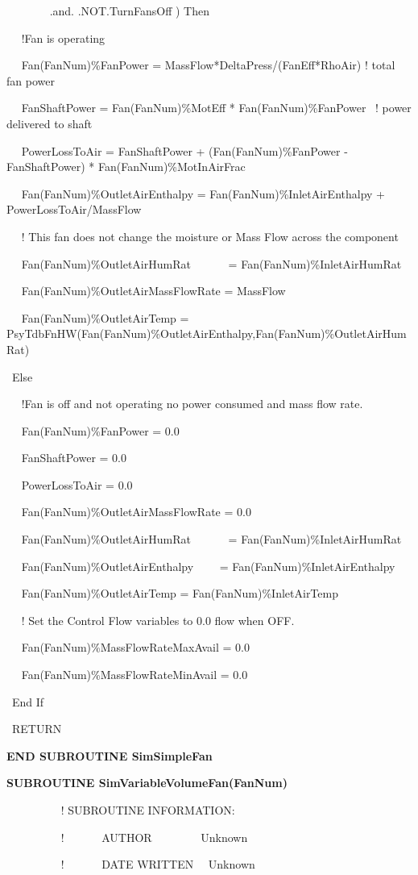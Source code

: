 ~~~~~~~ .and. .NOT.TurnFansOff ) Then

~~ !Fan is operating

~~ Fan(FanNum)\%FanPower = MassFlow*DeltaPress/(FanEff*RhoAir) ! total fan power

~~ FanShaftPower = Fan(FanNum)\%MotEff * Fan(FanNum)\%FanPower~ ! power delivered to shaft

~~ PowerLossToAir = FanShaftPower + (Fan(FanNum)\%FanPower - FanShaftPower) * Fan(FanNum)\%MotInAirFrac

~~ Fan(FanNum)\%OutletAirEnthalpy = Fan(FanNum)\%InletAirEnthalpy + PowerLossToAir/MassFlow

~~ ! This fan does not change the moisture or Mass Flow across the component

~~ Fan(FanNum)\%OutletAirHumRat~~~~~~ = Fan(FanNum)\%InletAirHumRat

~~ Fan(FanNum)\%OutletAirMassFlowRate = MassFlow

~~ Fan(FanNum)\%OutletAirTemp = PsyTdbFnHW(Fan(FanNum)\%OutletAirEnthalpy,Fan(FanNum)\%OutletAirHumRat)

~Else

~~ !Fan is off and not operating no power consumed and mass flow rate.

~~ Fan(FanNum)\%FanPower = 0.0

~~ FanShaftPower = 0.0

~~ PowerLossToAir = 0.0

~~ Fan(FanNum)\%OutletAirMassFlowRate = 0.0

~~ Fan(FanNum)\%OutletAirHumRat~~~~~~ = Fan(FanNum)\%InletAirHumRat

~~ Fan(FanNum)\%OutletAirEnthalpy~~~~ = Fan(FanNum)\%InletAirEnthalpy

~~ Fan(FanNum)\%OutletAirTemp = Fan(FanNum)\%InletAirTemp

~~ ! Set the Control Flow variables to 0.0 flow when OFF.

~~ Fan(FanNum)\%MassFlowRateMaxAvail = 0.0

~~ Fan(FanNum)\%MassFlowRateMinAvail = 0.0

~End If

~RETURN

\textbf{END SUBROUTINE SimSimpleFan}

\textbf{SUBROUTINE SimVariableVolumeFan(FanNum)}

~~~~~~~~~ ! SUBROUTINE INFORMATION:

~~~~~~~~~ !~~~~~~ AUTHOR~~~~~~~~ Unknown

~~~~~~~~~ !~~~~~~ DATE WRITTEN~~ Unknown

